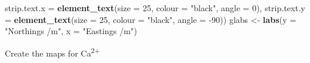 \documentclass[]{book}
\newenvironment{Shaded}{\begin{snugshade}}{\end{snugshade}}
\newcommand{\DataTypeTok}[1]{\textcolor[rgb]{0.13,0.29,0.53}{#1}}
\newcommand{\DecValTok}[1]{\textcolor[rgb]{0.00,0.00,0.81}{#1}}
\newcommand{\KeywordTok}[1]{\textcolor[rgb]{0.13,0.29,0.53}{\textbf{#1}}}
\newcommand{\NormalTok}[1]{#1}
\newcommand{\StringTok}[1]{\textcolor[rgb]{0.31,0.60,0.02}{#1}}
\begin{document}
\begin{Shaded}
\begin{Highlighting}[]
                    \DataTypeTok{strip.text.x =} \KeywordTok{element_text}\NormalTok{(}\DataTypeTok{size =} \DecValTok{25}\NormalTok{, }\DataTypeTok{colour =} \StringTok{"black"}\NormalTok{, }\DataTypeTok{angle =} \DecValTok{0}\NormalTok{), }\DataTypeTok{strip.text.y =} \KeywordTok{element_text}\NormalTok{(}\DataTypeTok{size =} \DecValTok{25}\NormalTok{, }
                                        \DataTypeTok{colour =} \StringTok{"black"}\NormalTok{, }\DataTypeTok{angle =} \DecValTok{-90}\NormalTok{))}
\NormalTok{glabs <-}\StringTok{ }\KeywordTok{labs}\NormalTok{(}\DataTypeTok{y =} \StringTok{"Northings /m"}\NormalTok{, }\DataTypeTok{x =} \StringTok{"Eastings /m"}\NormalTok{)}
\end{Highlighting}
\end{Shaded}

Create the maps for Ca\textsuperscript{2+}
\end{document}
